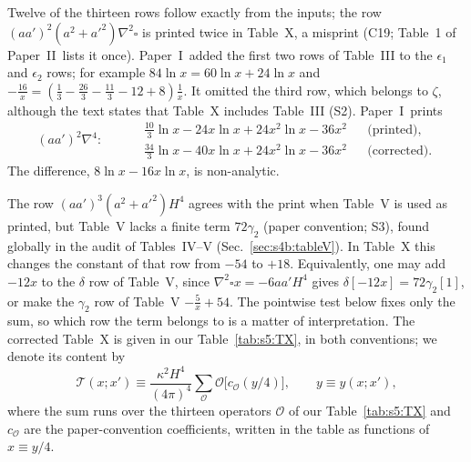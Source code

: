 \documentclass[aps,prd,onecolumn,10pt,nofootinbib,floatfix]{revtex4-2}
\newcommand{\PI}{Paper~I}
\newcommand{\PII}{Paper~II}
\newcommand{\Tab}{\mathcal{T}}
\begin{document}
Twelve of the thirteen rows follow exactly from the inputs; the row $(aa')^2(a^2+a'^2)\nabla^2\square$ is printed twice in Table~X, a misprint (C19; Table~1 of \PII\ lists it once).
\PI\ added the first two rows of Table~III to the $\epsilon_1$ and $\epsilon_2$ rows; for example $84\ln x=60\ln x+24\ln x$ and $-\frac{16}{x}=(\frac13-\frac{26}3-\frac{11}3-12+8)\frac1x$.
It omitted the third row, which belongs to $\zeta$, although the text states that Table~X includes Table~III (S2).
\PI\ prints
\begin{equation}
(aa')^2\nabla^4:\qquad
\begin{aligned}
&\tfrac{10}{3}\ln x-24x\ln x+24x^2\ln x-36x^2 &&\text{(printed)},\\
&\tfrac{34}{3}\ln x-40x\ln x+24x^2\ln x-36x^2 &&\text{(corrected)}.
\end{aligned}
\label{eq:s5:zeta}
\end{equation}
The difference, $8\ln x-16x\ln x$, is non-analytic.

The row $(aa')^3(a^2+a'^2)H^4$ agrees with the print when Table~V is used as printed, but Table~V lacks a finite term $72\gamma_2$ (paper convention; S3), found globally in the audit of Tables~IV--V (Sec.~\ref{sec:s4b:tableV}).
In Table~X this changes the constant of that row from $-54$ to $+18$.
Equivalently, one may add $-12x$ to the $\delta$ row of Table~V, since $\nabla^2\square x=-6aa'H^4$ gives $\delta[-12x]=72\gamma_2[1]$, or make the $\gamma_2$ row of Table~V $-\frac5x+54$.
The pointwise test below fixes only the sum, so which row the term belongs to is a matter of interpretation.
The corrected Table~X is given in our Table~\ref{tab:s5:TX}, in both conventions; we denote its content by
\begin{equation}
\Tab(x;x')\equiv\frac{\kappa^2H^4}{(4\pi)^4}\sum_{\mathcal O}\mathcal O\big[c_{\mathcal O}(y/4)\big],\qquad y\equiv y(x;x'),
\label{eq:s5:Tdef}
\end{equation}
where the sum runs over the thirteen operators $\mathcal O$ of our Table~\ref{tab:s5:TX} and $c_{\mathcal O}$ are the paper-convention coefficients, written in the table as functions of $x\equiv y/4$.
\end{document}
